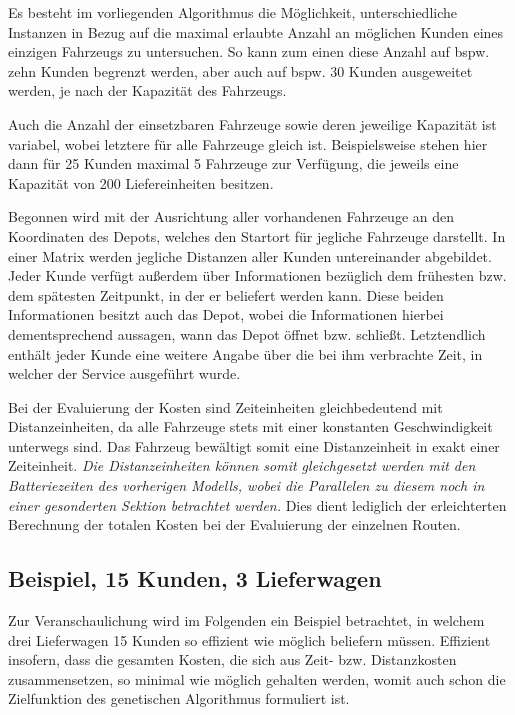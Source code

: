 \documentclass[a4paper,12pt,parskip,bibtotoc,liststotoc]{article}
\begin{document}
Es besteht im vorliegenden Algorithmus die Möglichkeit, unterschiedliche Instanzen in Bezug auf die maximal erlaubte Anzahl an möglichen Kunden eines einzigen Fahrzeugs zu untersuchen. 
So kann zum einen diese Anzahl auf bspw. zehn Kunden begrenzt werden, aber auch auf bspw. 30 Kunden ausgeweitet werden, je nach der Kapazität des Fahrzeugs. 

Auch die Anzahl der einsetzbaren Fahrzeuge sowie deren jeweilige Kapazität ist variabel, wobei letztere für alle Fahrzeuge gleich ist.
Beispielsweise stehen hier dann für 25 Kunden maximal 5 Fahrzeuge zur Verfügung, die jeweils eine Kapazität von 200 Liefereinheiten besitzen. 

Begonnen wird mit der Ausrichtung aller vorhandenen Fahrzeuge an den Koordinaten des Depots, welches den Startort für jegliche Fahrzeuge darstellt.
In einer Matrix werden jegliche Distanzen aller Kunden untereinander abgebildet.
Jeder Kunde verfügt außerdem über Informationen bezüglich dem frühesten bzw. dem spätesten Zeitpunkt, in der er beliefert werden kann.
Diese beiden Informationen besitzt auch das Depot, wobei die Informationen hierbei dementsprechend aussagen, wann das Depot öffnet bzw. schließt.
Letztendlich enthält jeder Kunde eine weitere Angabe über die bei ihm verbrachte Zeit, in welcher der Service ausgeführt wurde.

Bei der Evaluierung der Kosten sind Zeiteinheiten gleichbedeutend mit Distanzeinheiten, da alle Fahrzeuge stets mit einer konstanten Geschwindigkeit unterwegs sind.
Das Fahrzeug bewältigt somit eine Distanzeinheit in exakt einer Zeiteinheit.
\textit{Die Distanzeinheiten können somit gleichgesetzt werden mit den Batteriezeiten des vorherigen Modells, wobei die Parallelen zu diesem noch in einer gesonderten Sektion betrachtet werden.}
Dies dient lediglich der erleichterten Berechnung der totalen Kosten bei der Evaluierung der einzelnen Routen.


\subsection{Beispiel, 15 Kunden, 3 Lieferwagen}

Zur Veranschaulichung wird im Folgenden ein Beispiel betrachtet, in welchem drei Lieferwagen 15 Kunden so effizient wie möglich beliefern müssen.
Effizient insofern, dass die gesamten Kosten, die sich aus Zeit- bzw. Distanzkosten zusammensetzen, so minimal wie möglich gehalten werden, womit auch schon die Zielfunktion des genetischen Algorithmus formuliert ist. 
\end{document}
